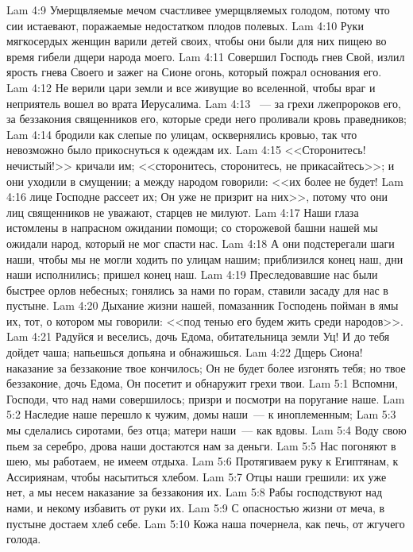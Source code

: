 \vs Lam 4:9 Умерщвляемые мечом счастливее умерщвляемых голодом, потому что сии истаевают, поражаемые недостатком плодов полевых.
\vs Lam 4:10 Руки мягкосердых женщин варили детей своих, чтобы они были для них пищею во время гибели дщери народа моего.
\vs Lam 4:11 Совершил Господь гнев Свой, излил ярость гнева Своего и зажег на Сионе огонь, который пожрал основания его.
\vs Lam 4:12 Не верили цари земли и все живущие во вселенной, чтобы враг и неприятель вошел во врата Иерусалима.
\vs Lam 4:13 ~--- за грехи лжепророков его, за беззакония священников его, которые среди него проливали кровь праведников;
\vs Lam 4:14 бродили как слепые по улицам, осквернялись кровью, так что невозможно было прикоснуться к одеждам их.
\vs Lam 4:15 <<Сторонитесь! нечистый!>> кричали им; <<сторонитесь, сторонитесь, не прикасайтесь>>; и они уходили в смущении; а между народом говорили: <<их более не будет!
\vs Lam 4:16 лице Господне рассеет их; Он уже не призрит на них>>, потому что они лиц священников не уважают, старцев не милуют.
\vs Lam 4:17 Наши глаза истомлены в напрасном ожидании помощи; со сторожевой башни нашей мы ожидали народ, который не мог спасти нас.
\vs Lam 4:18 А они подстерегали шаги наши, чтобы мы не могли ходить по улицам нашим; приблизился конец наш, дни наши исполнились; пришел конец наш.
\vs Lam 4:19 Преследовавшие нас были быстрее орлов небесных; гонялись за нами по горам, ставили засаду для нас в пустыне.
\vs Lam 4:20 Дыхание жизни нашей, помазанник Господень пойман в ямы их, тот, о котором мы говорили: <<под тенью его будем жить среди народов>>.
\vs Lam 4:21 Радуйся и веселись, дочь Едома, обитательница земли Уц! И до тебя дойдет чаша; напьешься допьяна и обнажишься.
\vs Lam 4:22 Дщерь Сиона! наказание за беззаконие твое кончилось; Он не будет более изгонять тебя; но твое беззаконие, дочь Едома, Он посетит и обнаружит грехи твои.
\vs Lam 5:1 Вспомни, Господи, что над нами совершилось; призри и посмотри на поругание наше.
\vs Lam 5:2 Наследие наше перешло к чужим, домы наши~--- к иноплеменным;
\vs Lam 5:3 мы сделались сиротами, без отца; матери наши~--- как вдовы.
\vs Lam 5:4 Воду свою пьем за серебро, дрова наши достаются нам за деньги.
\vs Lam 5:5 Нас погоняют в шею, мы работаем,  не имеем отдыха.
\vs Lam 5:6 Протягиваем руку к Египтянам, к Ассириянам, чтобы насытиться хлебом.
\vs Lam 5:7 Отцы наши грешили: их уже нет, а мы несем наказание за беззакония их.
\vs Lam 5:8 Рабы господствуют над нами, и некому избавить от руки их.
\vs Lam 5:9 С опасностью жизни от меча, в пустыне достаем хлеб себе.
\vs Lam 5:10 Кожа наша почернела, как печь, от жгучего голода.
